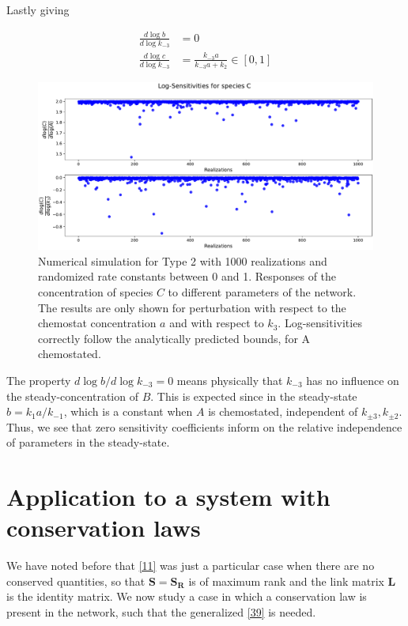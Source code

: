 \documentclass{article}
\begin{document}
	
	Lastly giving
	
	\begin{center}
		\begin{equation}
			\begin{aligned}
				\frac{d \log b}{d \log k_{-3}} &= 0 \\
				\frac{d \log c}{d \log k_{-3}} &= \frac{k_{-3} a}{k_{-3} a +k_2} \in \left[0, 1 \right]
			\end{aligned}
		\end{equation}
	\end{center}
	
	\begin{figure}[H]
		\centering
		\includegraphics[width=0.95 \linewidth]{Sens_X3_chemoA.pdf}
		\caption{\small{Numerical simulation for Type 2 with 1000 realizations and randomized rate constants between 0 and 1. Responses of the concentration of species $C$ to different  parameters of the network. The results are only shown for perturbation with respect to the chemostat concentration $a$ and with respect to $k_{3}$. Log-sensitivities correctly follow the analytically predicted bounds, for A chemostated.}}
		\label{Fig. 4}
	\end{figure}
	
	The property $d \log b/ d \log k_{-3} =0$ means physically that $k_{-3}$ has no influence on the steady-concentration of $B$. This is expected since in the steady-state $b=k_1 a/k_{-1}$, which is a constant when $A$ is chemostated, independent of $k_{\pm 3}, k_{\pm 2}$. Thus, we see that zero sensitivity coefficients inform on the relative independence of parameters in the steady-state. 
	
	\section{Application to a system with conservation laws}
	
	We have noted before that \eqref{11} was just a particular case when there are no conserved quantities, so that $\mathbf{S} = \mathbf{S_R}$ is of maximum rank and the link matrix $\mathbf{L}$ is the identity matrix. We now study a case in which a conservation law is present in the network, such that the generalized \eqref{39} is needed.
	
\end{document}
